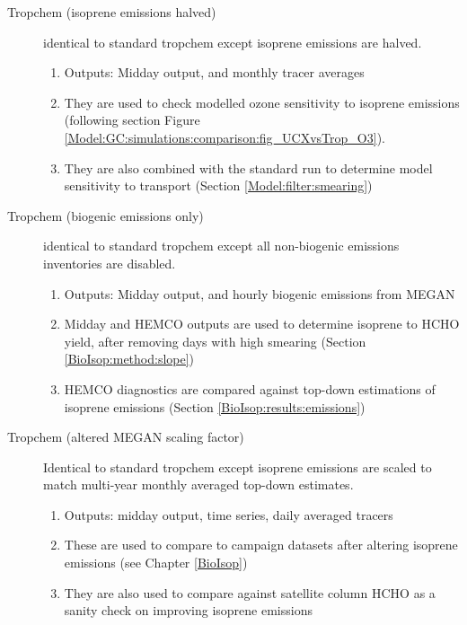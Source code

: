 \begin{description}
        \item [Tropchem (isoprene emissions halved)]%
          identical to standard tropchem except isoprene emissions are halved.
          \begin{enumerate}
            \item Outputs: Midday output, and monthly tracer averages 
            \item They are used to check modelled ozone sensitivity to isoprene emissions (following section Figure \ref{Model:GC:simulations:comparison:fig_UCXvsTrop_O3}).
            \item They are also combined with the standard run to determine model sensitivity to transport (Section \ref{Model:filter:smearing})
          \end{enumerate}
          
        \item [Tropchem (biogenic emissions only)]%
          identical to standard tropchem except all non-biogenic emissions inventories are disabled.
          \begin{enumerate}
            \item Outputs: Midday output, and hourly biogenic emissions from MEGAN
            \item Midday and HEMCO outputs are used to determine isoprene to HCHO yield, after removing days with high smearing (Section \ref{BioIsop:method:slope})
            \item HEMCO diagnostics are compared against top-down estimations of isoprene emissions (Section \ref{BioIsop:results:emissions})
          \end{enumerate}
        
        \item [Tropchem (altered MEGAN scaling factor)]%
          Identical to standard tropchem except isoprene emissions are scaled to match multi-year monthly averaged top-down estimates.
          \begin{enumerate}
            \item Outputs: midday output, time series, daily averaged tracers
            \item These are used to compare to campaign datasets after altering isoprene emissions (see Chapter \ref{BioIsop})
            \item They are also used to compare against satellite column HCHO as a sanity check on improving isoprene emissions
          \end{enumerate}
      \end{description}

